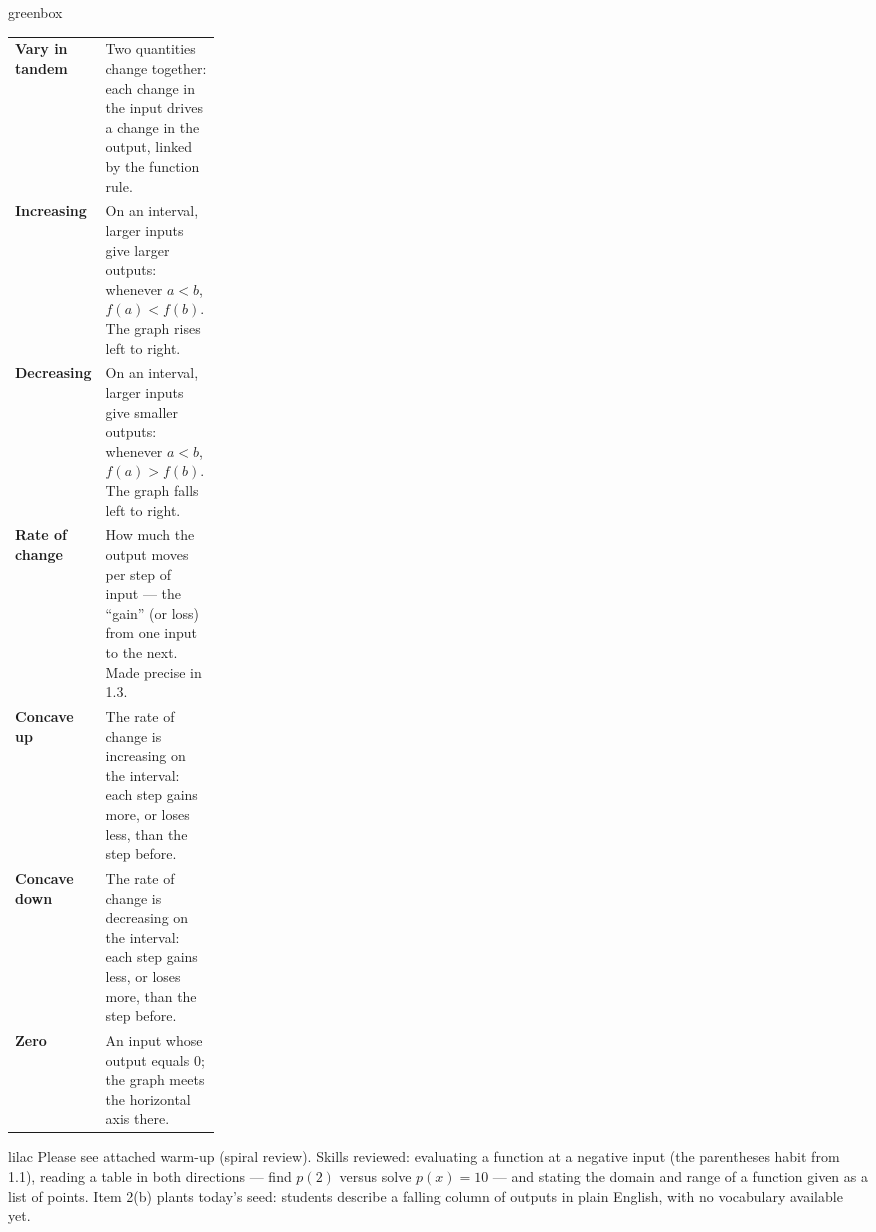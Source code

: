\documentclass[10pt]{article}
\begin{document}
\begin{skillbox}{greenbox}
\renewcommand{\arraystretch}{1.4}
\begin{tabularx}{\linewidth}{@{} >{\leavevmode\bfseries\color{plum}}p{0.24\linewidth} X @{}}
Vary in tandem  & Two quantities change together: each change in the input drives a change in the output, linked by the function rule. \\
Increasing      & On an interval, larger inputs give larger outputs: whenever $a < b$, $f(a) < f(b)$. The graph rises left to right. \\
Decreasing      & On an interval, larger inputs give smaller outputs: whenever $a < b$, $f(a) > f(b)$. The graph falls left to right. \\
Rate of change  & How much the output moves per step of input --- the ``gain'' (or loss) from one input to the next. Made precise in 1.3. \\
Concave up      & The rate of change is increasing on the interval: each step gains more, or loses less, than the step before. \\
Concave down    & The rate of change is decreasing on the interval: each step gains less, or loses more, than the step before. \\
Zero            & An input whose output equals 0; the graph meets the horizontal axis there. \\
\end{tabularx}
\end{skillbox}

\begin{skillbox}{lilac}
    Please see attached warm-up (spiral review).
    Skills reviewed: evaluating a function at a negative input (the
    parentheses habit from 1.1), reading a table in both directions ---
    find $p(2)$ versus solve $p(x) = 10$ --- and stating the domain and range
    of a function given as a list of points. Item 2(b) plants today's seed:
    students describe a falling column of outputs in plain English, with no
    vocabulary available yet.
\end{skillbox}
\end{document}
